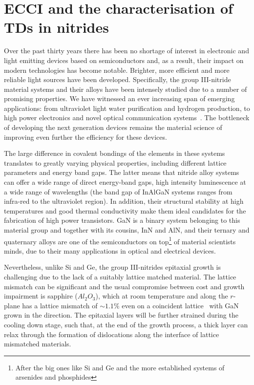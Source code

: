 \section{ECCI and the characterisation of TDs in nitrides  }
\label{sec:ECCITDmotivation}

Over the past thirty years there has been no shortage of interest in electronic and light emitting devices based on semiconductors and, as a result, their impact on modern technologies has become notable. Brighter, more efficient and more reliable light sources have been developed. Specifically, the group III-nitride material systems and their alloys have been intensely studied due to a number of promising properties. We have witnessed an ever increasing  span of emerging applications: from ultraviolet light water purification and hydrogen production, to high power electronics and novel optical communication systems~\cite{Kneissl10}. The bottleneck of developing the next generation devices remains the material science of improving even further the efficiency for these devices.

 The large difference in covalent bondings of the elements in these systems translates to greatly varying physical properties, including different lattice parameters and energy band gaps. The latter means that nitride alloy systems can offer a wide range of direct energy-band gaps, \ie high intensity luminescence at a wide range of wavelengths (\eg the band gap of InAlGaN systems ranges from infra-red to the ultraviolet region).  In addition, their structural stability at high temperatures and good thermal conductivity make them ideal candidates for the fabrication of high power transistors. GaN is a binary system belonging to this material group and together with its cousins, InN and AlN, and their ternary and quaternary alloys are one of the semiconductors on top\footnote{After the big ones like Si and Ge and the more established systems of arsenides and phosphides} of material scientists minds, due to their many applications in optical and electrical devices.  

Nevertheless, unlike Si and Ge, the group III-nitrides epitaxial growth is challenging due to the lack of a suitably lattice matched material. The lattice mismatch can be significant and the usual compromise between cost and growth impairment is sapphire ($Al_2O_3$), which at room temperature and along the $r$-plane has a lattice mismatch of $\sim1.1\%$ even on a coincident lattice~\cite{nitrides} with GaN grown in the \hkl[0001] direction. The epitaxial layers will be further strained during the cooling down stage, such that, at the end of the growth process, a thick layer can relax through the formation of dislocations along the interface of lattice mismatched materials.


